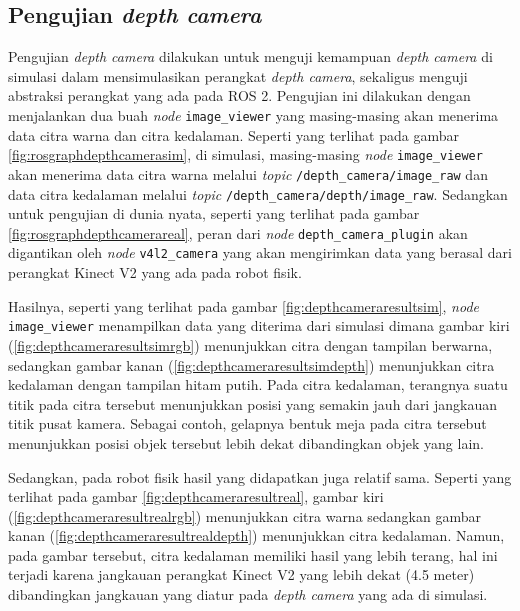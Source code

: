 \subsection{Pengujian \emph{depth camera}}
\label{subsec:depthcameratesting}




Pengujian \emph{depth camera} dilakukan untuk menguji kemampuan \emph{depth camera} di simulasi dalam mensimulasikan perangkat \emph{depth camera},
  sekaligus menguji abstraksi perangkat yang ada pada ROS 2.
Pengujian ini dilakukan dengan menjalankan dua buah \emph{node} \lstinline{image_viewer} yang masing-masing akan menerima data citra warna dan citra kedalaman.
Seperti yang terlihat pada gambar \ref{fig:rosgraphdepthcamerasim},
  di simulasi,
  masing-masing \emph{node} \lstinline{image_viewer} akan menerima data citra warna melalui \emph{topic} \lstinline{/depth_camera/image_raw} dan data citra kedalaman melalui \emph{topic} \lstinline{/depth_camera/depth/image_raw}.
Sedangkan untuk pengujian di dunia nyata,
  seperti yang terlihat pada gambar \ref{fig:rosgraphdepthcamerareal},
  peran dari \emph{node} \lstinline{depth_camera_plugin} akan digantikan oleh \emph{node} \lstinline{v4l2_camera} yang akan mengirimkan data yang berasal dari perangkat Kinect V2 yang ada pada robot fisik.



Hasilnya,
  seperti yang terlihat pada gambar \ref{fig:depthcameraresultsim},
  \emph{node} \lstinline{image_viewer} menampilkan data yang diterima dari simulasi dimana gambar kiri (\ref{fig:depthcameraresultsimrgb}) menunjukkan citra dengan tampilan berwarna,
  sedangkan gambar kanan (\ref{fig:depthcameraresultsimdepth}) menunjukkan citra kedalaman dengan tampilan hitam putih.
Pada citra kedalaman,
  terangnya suatu titik pada citra tersebut menunjukkan posisi yang semakin jauh dari jangkauan titik pusat kamera.
Sebagai contoh,
  gelapnya bentuk meja pada citra tersebut menunjukkan posisi objek tersebut lebih dekat dibandingkan objek yang lain.



Sedangkan,
  pada robot fisik hasil yang didapatkan juga relatif sama.
Seperti yang terlihat pada gambar \ref{fig:depthcameraresultreal},
  gambar kiri (\ref{fig:depthcameraresultrealrgb}) menunjukkan citra warna sedangkan gambar kanan (\ref{fig:depthcameraresultrealdepth}) menunjukkan citra kedalaman.
Namun,
  pada gambar tersebut,
  citra kedalaman memiliki hasil yang lebih terang,
  hal ini terjadi karena jangkauan perangkat Kinect V2 yang lebih dekat (4.5 meter) dibandingkan jangkauan yang diatur pada \emph{depth camera} yang ada di simulasi.
